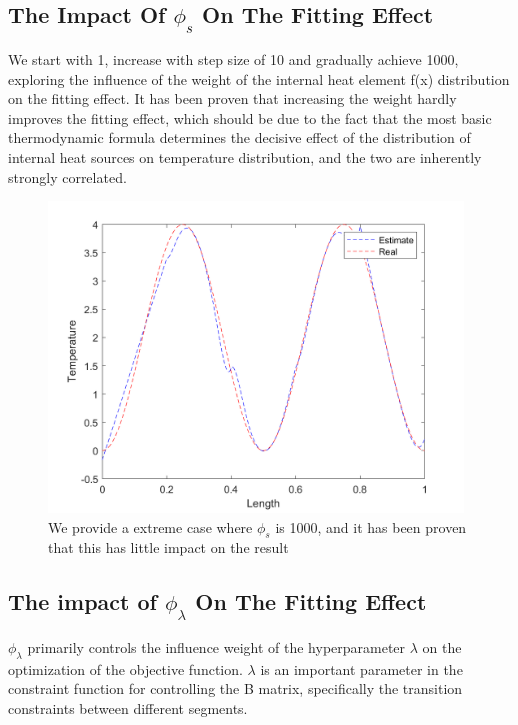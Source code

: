 \documentclass{article}
\begin{document}
\subsection{The Impact Of $\phi_s$ On The Fitting Effect}
We start with 1, increase with step size of 10 and gradually achieve 1000, exploring the influence of the weight of the internal heat element f(x) distribution on the fitting effect. It has been proven that increasing the weight hardly improves the fitting effect, which should be due to the fact that the most basic thermodynamic formula determines the decisive effect of the distribution of internal heat sources on temperature distribution, and the two are inherently strongly correlated.
 \begin{figure}[H]
        \centering %
        \includegraphics[width=11cm]{pic/phi_s=1000.png} %
        \caption{We provide a extreme case where $\phi_s$ is 1000, and it has been proven that this has little impact on the result} %
        \label{phi_s=1000}
    \end{figure}     
\subsection{The impact of $\phi_{\lambda}$ On The Fitting Effect}
$\phi_{\lambda}$ primarily controls the influence weight of the hyperparameter $\lambda$ on the optimization of the objective function. $\lambda$ is an important parameter in the constraint function for controlling the B matrix, specifically the transition constraints between different segments.
\end{document}
